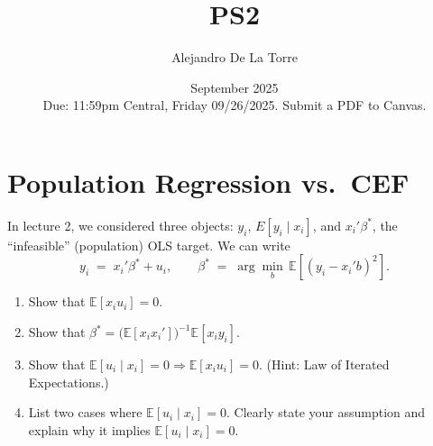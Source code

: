 \documentclass[12pt]{article}
\title{PS2}
\author{Alejandro De La Torre}
\date{September 2025\\[2pt]
\small Due: 11:59pm Central, Friday 09/26/2025. Submit a PDF to Canvas.}
\numberwithin{equation}{section}
\begin{document}
\maketitle

\section{Population Regression vs.\ CEF}  %
In lecture 2, we considered three objects: $y_i$, $E[y_i\mid x_i]$, and $x_i' \beta^{\ast}$, the
``infeasible'' (population) OLS target. We can write
\[
y_i \;=\; x_i' \beta^{\ast} + u_i, \qquad
\beta^{\ast} \;=\; \arg\min_b\, \mathbb{E}\!\left[(y_i - x_i' b)^2\right].
\]
\begin{enumerate}[label=\arabic*.]
  \item Show that $\mathbb{E}[x_i u_i]=0$.
  \item Show that $\displaystyle \beta^{\ast} = \Big(\mathbb{E}[x_i x_i']\Big)^{-1}\mathbb{E}[x_i y_i]$.
  \item Show that $\mathbb{E}[u_i\mid x_i]=0 \Rightarrow \mathbb{E}[x_i u_i]=0$. (Hint: Law of Iterated Expectations.)
  \item List two cases where $\mathbb{E}[u_i\mid x_i]=0$. Clearly state your assumption and explain why it implies $\mathbb{E}[u_i\mid x_i]=0$.
\end{enumerate}
\end{document}
